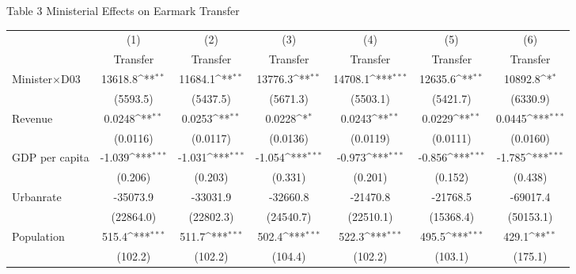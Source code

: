 \documentclass[11pt,a4paper]{article}
\begin{document}
\newpage

\begin{center}
Table 3 Ministerial Effects on Earmark Transfer \\
\medskip
\begin{scriptsize}

{
\def\sym#1{\ifmmode^{#1}\else\(^{#1}\)\fi}
\begin{tabular}{l*{6}{c}}
\hline\hline
            &\multicolumn{1}{c}{(1)}&\multicolumn{1}{c}{(2)}&\multicolumn{1}{c}{(3)}&\multicolumn{1}{c}{(4)}&\multicolumn{1}{c}{(5)}&\multicolumn{1}{c}{(6)}\\
            &\multicolumn{1}{c}{Transfer}&\multicolumn{1}{c}{Transfer}&\multicolumn{1}{c}{Transfer}&\multicolumn{1}{c}{Transfer}&\multicolumn{1}{c}{Transfer}&\multicolumn{1}{c}{Transfer}\\
\hline
Minister$\times$D03         &     13618.8\sym{**} &     11684.1\sym{**} &     13776.3\sym{**} &       14708.1\sym{***}&       12635.6\sym{**} &     10892.8\sym{*} \\
            &    (5593.5)         &    (5437.5)         &    (5671.3)         &    (5503.1)        &   (5421.7)         &    (6330.9)      \\
[1em]
Revenue &      0.0248\sym{**} &      0.0253\sym{**} &      0.0228\sym{*}  &      0.0243\sym{**} &     0.0229\sym{**} &      0.0445\sym{***}  \\
            &    (0.0116)         &    (0.0117)         &    (0.0136)         &   (0.0119)       &     (0.0111)         &    (0.0160)           \\
[1em]
GDP per capita &      -1.039\sym{***}&      -1.031\sym{***}&      -1.054\sym{***}&      -0.973\sym{***} &      -0.856\sym{***}&      -1.785\sym{***}\\
            &     (0.206)         &     (0.203)         &     (0.331)         &    (0.201)     &      (0.152)         &     (0.438)      \\
[1em]
Urbanrate   &    -35073.9         &    -33031.9         &    -32660.8         &     -21470.8         &   -21768.5         &    -69017.4         \\
            &   (22864.0)         &   (22802.3)         &   (24540.7)         &    (22510.1)         &  (15368.4)         &   (50153.1)            \\
[1em]
Population  &       515.4\sym{***}&       511.7\sym{***}&       502.4\sym{***}&        522.3\sym{***}&         495.5\sym{***}&       429.1\sym{**} \\
            &     (102.2)         &     (102.2)         &     (104.4)         &    (102.2)        &     (103.1)         &     (175.1)      \\

\end{tabular}}
\end{scriptsize}
\end{center}
\end{document}
